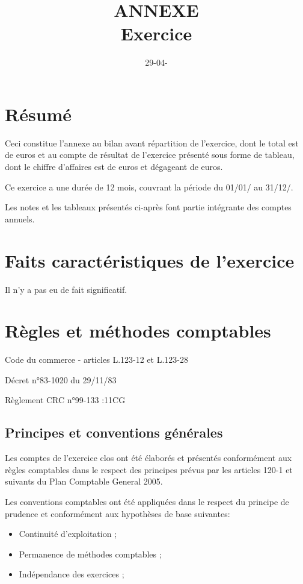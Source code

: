 \documentclass[letterpaper]{article}
\author{}
\date{29-04-\GenYear}
\begin{document}
\setcounter{page}{1}
\title{ANNEXE\\Exercice \FacctYear}
\maketitle
\thispagestyle{firststyle}

\tableofcontents
\clearpage
\section{Résumé}
Ceci constitue l’annexe au bilan avant répartition de l'exercice, dont le total
 est de {\AnxTotalExercice} euros et au compte de résultat de l'exercice
 présenté sous forme de tableau, dont le chiffre d'affaires est de
 {\AnxChiffreAffaire} euros et dégageant {\AnxPerteBenefName} de
 {\AnxPerteBenef} euros.\par
Ce {\AnxNbYear} exercice a une durée de 12 mois, couvrant la période du
 01/01/{\FacctYear} au 31/12/{\FacctYear}.\par
Les notes et les tableaux présentés ci-après font partie intégrante des
 comptes annuels.

\section{Faits caractéristiques de l'exercice}
Il n’y a pas eu de fait significatif.

\section{Règles et méthodes comptables}
Code du commerce - articles L.123-12 et L.123-28\par
Décret n°83-1020 du 29/11/83\par
Règlement CRC n°99-133 :11CG\par
\subsection{Principes et conventions générales}
Les comptes de l'exercice clos ont été élaborés et présentés conformément aux
 règles comptables dans le respect des principes prévus par les articles 120-1
 et suivants du Plan Comptable General 2005.\\\par

Les conventions comptables ont été appliquées dans le respect du principe de
 prudence et conformément aux hypothèses de base suivantes:
\begin{itemize}
\item Continuité d’exploitation ;
\item Permanence de méthodes comptables ;
\item Indépendance des exercices ;
\end{itemize}
\end{document}
